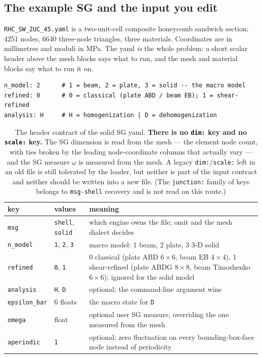 \subsection{The example SG and the input you edit}

\texttt{RHC\_SW\_2UC\_45.yaml} is a two-unit-cell composite honeycomb sandwich
section: 4251 nodes, 6640 three-node triangles, three materials. Coordinates
are in millimetres and moduli in MPa. The yaml \emph{is} the whole problem: a
short scalar header above the mesh blocks says what to run, and the mesh and
material blocks say what to run it on.

\begin{lstlisting}[style=opensg,caption={The header of a solid SG yaml. Every key is defaulted; a headerless mesh still runs.}]
n_model: 2      # 1 = beam, 2 = plate, 3 = solid -- the macro model
refined: 0      # 0 = classical (plate ABD / beam EB); 1 = shear-refined
analysis: H     # H = homogenization | D = dehomogenization
\end{lstlisting}

\begin{table}[htbp]
\centering
\footnotesize
\begin{tabular}{llp{7.6cm}}
\toprule
key & values & meaning \\
\midrule
\texttt{msg} & \texttt{shell}, \texttt{solid}
  & which engine owns the file; omit and the mesh dialect decides \\
\texttt{n\_model} & \texttt{1}, \texttt{2}, \texttt{3}
  & macro model: 1 beam, 2 plate, 3 3-D solid \\
\texttt{refined} & \texttt{0}, \texttt{1}
  & 0 classical (plate ABD $6\times6$, beam EB $4\times4$), 1 shear-refined
    (plate ABDG $8\times8$, beam Timoshenko $6\times6$); ignored for the solid
    model \\
\texttt{analysis} & \texttt{H}, \texttt{D}
  & optional; the command-line argument wins \\
\texttt{epsilon\_bar} & 6 floats & the macro state for \texttt{D} \\
\texttt{omega} & float
  & optional user SG measure, overriding the one measured from the mesh \\
\texttt{aperiodic} & \texttt{1}
  & optional; zero fluctuation on every bounding-box-face node instead of
    periodicity \\
\bottomrule
\end{tabular}
\caption{The header contract of the solid SG yaml. \textbf{There is no
\texttt{dim:} key and no \texttt{scale:} key.} The SG dimension is read from
the mesh --- the element node count, with ties broken by the leading
node-coordinate columns that actually vary --- and the SG measure $\omega$ is
measured from the mesh. A legacy \texttt{dim:}/\texttt{scale:} left in an old
file is still tolerated by the loader, but neither is part of the input
contract and neither should be written into a new file. (The
\texttt{junction:} family of keys belongs to \texttt{msg-shell} recovery and is
not read on this route.)}
\label{tab:solid-header}
\end{table}

